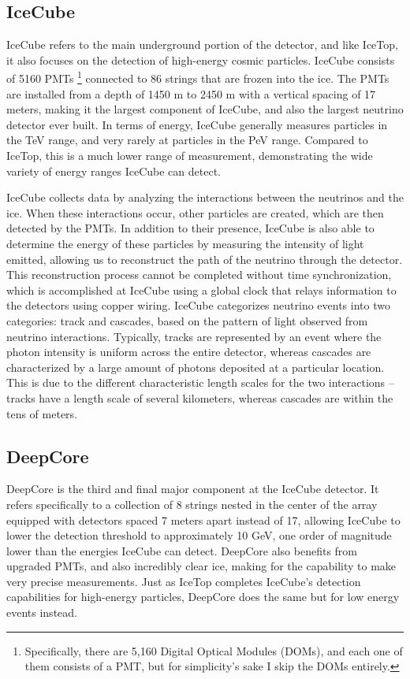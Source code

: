\documentclass[11pt]{article}
\begin{document}
    \subsection{IceCube}
    IceCube refers to the main underground portion of the detector, and like IceTop, it also focuses on 
    the detection of high-energy cosmic particles. IceCube consists of
    5160 PMTs \footnote{Specifically, there are 5,160 Digital Optical Modules (DOMs),
    and each one of them consists of a PMT, but for simplicity's sake I skip the DOMs entirely.}
    connected to 86 strings that are frozen into the ice. The PMTs are installed from 
    a depth of 1450 m to 2450 m with a vertical spacing of 17 meters, making it the largest
    component of IceCube, and also the largest neutrino detector ever built. In terms of
    energy, IceCube generally measures particles in the TeV range, and 
    very rarely at particles in the PeV range. Compared to IceTop, this is a much 
    lower range of measurement, demonstrating the wide variety of energy ranges 
    IceCube can detect.

    IceCube collects data by analyzing the interactions between the neutrinos and the ice. 
    When these interactions occur, other particles are created, which are then detected
    by the PMTs. In addition to their presence, IceCube is also able to determine the energy 
    of these particles by measuring the intensity of light emitted, allowing us to
    reconstruct the path of the neutrino through the detector. This reconstruction process
    cannot be completed without time synchronization, which is accomplished at IceCube using a 
    global clock that relays information to the detectors using copper wiring. 
    IceCube categorizes neutrino events into two categories: track
    and cascades, based on the pattern of light observed from neutrino interactions.
    Typically, tracks are represented by an event where the photon intensity is uniform
    across the entire detector, whereas cascades are characterized by a large amount of 
    photons deposited at a particular location. This is due to the different characteristic 
    length scales for the two interactions -- tracks have a length scale of several kilometers, 
    whereas cascades are within the tens of meters. 

    \subsection{DeepCore}
    DeepCore is the third and final major component at the IceCube detector. It refers 
    specifically to a collection of 8 strings nested in the center of the array equipped
    with detectors spaced 7 meters apart instead of 17, allowing IceCube to lower the detection 
    threshold to approximately 10 GeV, one order of magnitude lower than the energies IceCube can 
    detect. DeepCore also benefits from upgraded PMTs, and also incredibly
    clear ice, making for the capability to make very precise measurements. Just as IceTop 
    completes IceCube's detection capabilities for high-energy particles, DeepCore does the 
    same but for low energy events instead.
\end{document}
